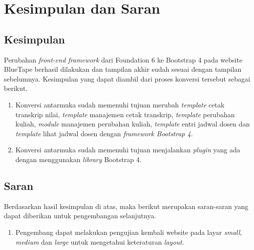 \chapter{Kesimpulan dan Saran}
\section{Kesimpulan}
Perubahan \textit{front-end framework} dari Foundation 6 ke Bootstrap 4 pada website BlueTape berhasil dilakukan dan tampilan akhir sudah sesuai dengan tampilan sebelumnya. Kesimpulan yang dapat diambil dari proses konversi tersebut sebagai berikut. 
\begin{enumerate}
	\item Konversi antarmuka sudah memenuhi tujuan merubah \textit{template} cetak transkrip nilai, \textit{template} manajemen cetak transkrip, \textit{template} perubahan kuliah, \textit{module} manajemen perubahan kuliah, \textit{template} entri jadwal dosen dan \textit{template} lihat jadwal dosen dengan \textit{framework Bootstrap 4}.
	\item Konversi antarmuka sudah memenuhi tujuan menjalankan \textit{plugin} yang ada dengan menggunakan \textit{library} Bootstrap 4.
\end{enumerate}


\section{Saran}
Berdasarkan hasil kesimpulan di atas, maka berikut merupakan saran-saran yang dapat diberikan untuk pengembangan selanjutnya.
\begin{enumerate}
	\item Pengembang dapat melakukan pengujian kembali website pada layar \textit{small}, \textit{medium} dan \textit{large} untuk mengetahui keteraturan \textit{layout}.	
\end{enumerate}